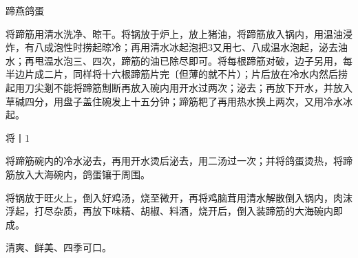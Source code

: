 \begin{recipe}{蹄燕鸽蛋}

\ingredients


\cooking

\step 将蹄筋用清水洗净、晾干。将锅放于炉上，放上猪油，将蹄筋放入锅内，用温油浸炸，有八成泡性时捞起晾冷；再用清水冰起泡把3又用七、八成温水泡起，泌去油水；再甩温水泡三、四次，蹄筋的油已除尽即可。将每根蹄筋对破，边子另用，每半边片成二片，同样将十六根蹄筋片完〔但薄的就不片）；片后放在冷水内然后捞起用刀尖剗不能将蹄筋劁断再放入碗内用开水过两次；泌去；再放下开水，并放入草碱四分，用盘子盖住碗发上十五分钟；蹄筋粑了再用热水换上两次，又用冷水冰起。

\step 将丨1%

\step 将蹄筋碗内的冷水泌去，再用开水烫后泌去，用二汤过一次；并将鸽蛋烫热，将蹄筋放入大海碗内，鸽蛋镶于周围。

\step 将锅放于旺火上，倒入好鸡汤，烧至微开，再将鸡脑茸用清水解散倒入锅内，肉沫浮起，打尽杂质，再放下味精、胡椒、料酒，烧开后，倒入装蹄筋的大海碗内即成。

\notes

清爽、鲜美、四季可口。

\end{recipe}

